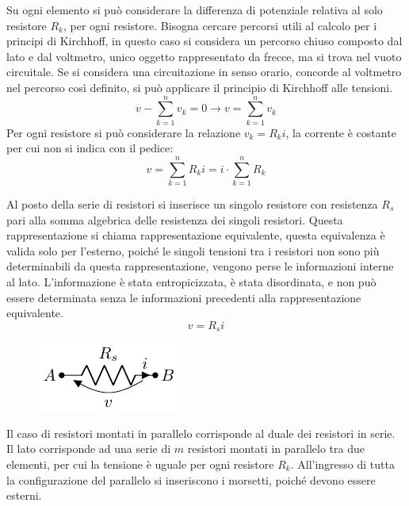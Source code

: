 \documentclass{article}
\numberwithin{equation}{subsection}
\begin{document}
Su ogni elemento si può considerare la differenza di potenziale relativa al solo resistore $R_k$, per ogni resistore. 
Bisogna cercare percorsi utili al calcolo per i principi di Kirchhoff, in questo caso si considera un percorso chiuso composto dal lato e dal voltmetro, unico oggetto 
rappresentato da frecce, ma si trova nel vuoto circuitale.  Se si considera una circuitazione in senso orario, concorde al voltmetro nel percorso così definito, si può 
applicare il principio di Kirchhoff alle tensioni. 
\begin{equation*}
    v-\displaystyle\sum_{k=1}^nv_k=0\to v=\displaystyle\sum_{k=1}^nv_k
\end{equation*}
Per ogni resistore si può considerare la relazione $v_k=R_ki$, la corrente è costante per cui non si indica con il pedice:
\begin{equation*}
    v=\displaystyle\sum_{k=1}^nR_ki=i\cdot\sum_{k=1}^nR_k
\end{equation*}

Al posto della serie di resistori si inserisce un singolo resistore con resistenza $R_s$ pari alla somma algebrica delle resistenza dei singoli resistori. Questa 
rappresentazione si chiama rappresentazione equivalente, questa equivalenza è valida solo per l'esterno, poiché le singoli tensioni tra i 
resistori non sono più determinabili da questa rappresentazione, vengono perse le informazioni interne al lato. L'informazione è stata entropicizzata, è stata disordinata, e 
non può essere determinata senza le informazioni precedenti alla rappresentazione equivalente. 
\begin{equation}
    v=R_si
\end{equation}
\begin{figure}[H]%
    \centering
    \includegraphics{resistori-serie-equivalente.pdf}%
    \label{fig:resistori-serie-equivalenti}
\end{figure}


Il caso di resistori montati in parallelo corrisponde al duale dei resistori in serie. Il lato corrisponde ad una serie di $m$ resistori montati in parallelo tra due elementi, 
per cui la tensione è uguale per ogni resistore $R_k$. All'ingresso di tutta la configurazione del parallelo si inseriscono i morsetti, poiché devono essere esterni. 
\end{document}
